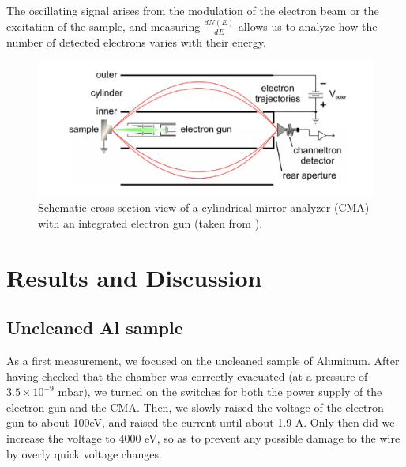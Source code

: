 \documentclass[12pt]{article}
\begin{document}
The oscillating signal arises from the modulation of the electron beam or the excitation of the sample, and measuring \( \frac{dN(E)}{dE} \) allows us to analyze how the number of detected electrons varies with their energy.




\begin{figure}
  \includegraphics[width=\linewidth]{setup_schematic.png}
  \caption{Schematic cross section view of a cylindrical mirror analyzer (CMA) with an integrated electron gun (taken from \cite{fu2024auger}).}
  \label{fig:cma}
\end{figure}

\section{Results and Discussion}
\subsection{Uncleaned Al sample}
As a first measurement, we focused on the uncleaned sample of Aluminum. After having checked that the chamber was correctly evacuated (at a pressure of $3.5 \times 10^{-9}\text{ mbar}$), we turned on the switches for both the power supply of the electron gun and the CMA. Then, we slowly raised the voltage of the electron gun to about 100eV, and raised the current until about 1.9 A. Only then did we increase the voltage to 4000 eV, so as to prevent any possible damage to the wire by overly quick voltage changes.
\end{document}
